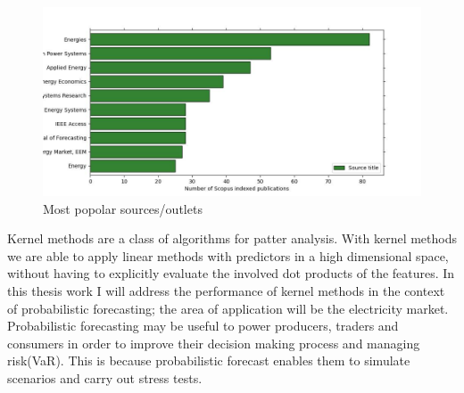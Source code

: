 \begin{figure}[h!]
  \includegraphics[width=\textwidth]{images/src_title.jpg}
  \caption{Most popolar sources/outlets}
  \label{fig:src_title}
\end{figure}


Kernel methods are a class of algorithms for patter analysis.
With kernel methods we are able to apply linear methods with predictors in a high dimensional space, without having to explicitly evaluate the involved dot products of the features.
In this thesis work I will address the performance of kernel methods in the context of probabilistic forecasting; the area of application will be the electricity market. 
Probabilistic forecasting may be useful to power producers, traders and consumers in order to improve their decision making process and managing risk(VaR). This is because probabilistic forecast enables them to simulate scenarios and carry out stress tests.


